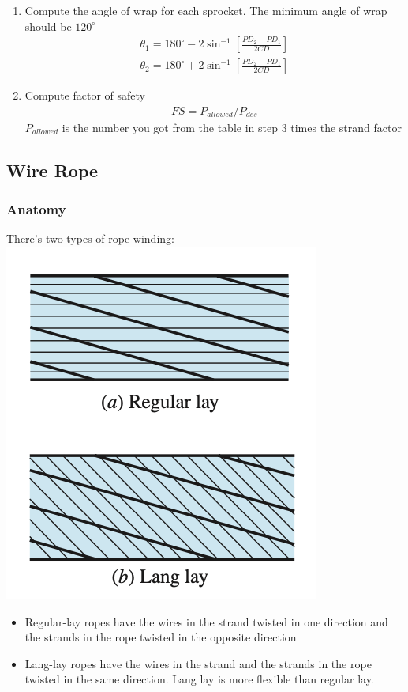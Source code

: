 \documentclass[11pt, fleqn]{article}
\begin{document}
\begin{enumerate}
    \item Compute the angle of wrap for each sprocket. The minimum angle of wrap should be $120^\circ$
    \begin{align*}
        \theta_1=180^{\circ}-2\sin^{-1}[\frac{PD_2-PD_1}{2CD}]\\
        \theta_2=180^{\circ}+2\sin^{-1}[\frac{PD_2-PD_1}{2CD}]
    \end{align*}
    \item Compute factor of safety
    \begin{align*}
        FS = P_{allowed}/P_{des}
    \end{align*}
    $P_{allowed}$ is the number you got from the table in step 3 times the strand factor
\end{enumerate}

\subsection{Wire Rope}
\subsubsection{Anatomy}
There's two types of rope winding:\\
\includegraphics[scale=0.8]{Belts/types-of-rope.png}
\begin{itemize}
    \item Regular-lay ropes have the wires in the strand twisted in one direction and the strands in the rope twisted in the opposite direction
    \item Lang-lay ropes have the wires in the strand and the strands in the rope twisted in the same direction. Lang lay is more flexible than regular lay.
\end{itemize}
\end{document}
